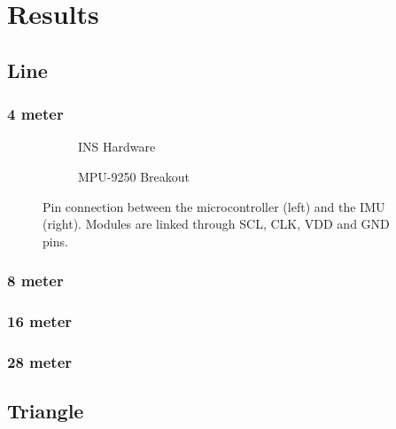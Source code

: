 \section{Results}
\subsection{Line}
\subsubsection{4 meter}
\begin{figure}[!h]
    \centering
    \begin{subfigure}{0.49\textwidth}
        \centering
        \resizebox{1\linewidth}{!}{}
        \caption{INS Hardware}
        \label{fig:sub1}
    \end{subfigure}
    \begin{subfigure}{0.49\textwidth}
        \centering
        \resizebox{1\linewidth}{!}{}
        \caption{MPU-9250 Breakout}
        \label{fig:sub2}
    \end{subfigure}
    \caption{Pin connection between the microcontroller (left) and the IMU (right). Modules are linked through SCL, CLK, VDD and GND pins.}
    \label{fig:mag_calibration_output}
\end{figure}

\begin{figure}[H]
    \centering
    
\end{figure}

\subsubsection{8 meter}
\subsubsection{16 meter}
\begin{figure}[H]
    \centering
    
\end{figure}
\subsubsection{28 meter}
\begin{figure}[H]
    \centering
    
\end{figure}
\subsection{Triangle}
